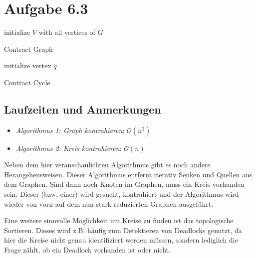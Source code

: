 \documentclass{article}
\begin{document}
\section*{Aufgabe 6.3}
\begin{algorithm}[H]
  initialize $V$ with all vertices of $G$\;
  \caption{Contract Graph}
\end{algorithm}

\begin{algorithm}[H]
  initialize vertex $q$\;
  \caption{Contract Cycle}
\end{algorithm}

\subsection*{Laufzeiten und Anmerkungen}

\begin{itemize}
	\item \textit{Algorithmus 1: Graph kontrahieren}: $\mathcal{O}(n^2)$
  \item \textit{Algorithmus 2: Kreis kontrahieren}: $\mathcal{O}(n)$
\end{itemize}

Neben dem hier veranschaulichten Algorithmus gibt es noch andere Herangehensweisen. Dieser Algorithmus entfernt iterativ Senken und Quellen aus dem Graphen. Sind dann noch Knoten im Graphen, muss ein Kreis vorhanden sein. Dieser (bzw. einer) wird gesucht, kontrahiert und der Algorithmus wird wieder von vorn auf dem nun stark reduzierten Graphen ausgeführt. 

Eine weitere sinnvolle Möglichkeit um Kreise zu finden ist das topologische Sortieren. Dieses wird z.B. häufig zum Detektieren von Deadlocks genutzt, da hier die Kreise nicht genau identifiziert werden müssen, sondern lediglich die Frage zählt, ob ein Deadlock vorhanden ist oder nicht.
\end{document}
